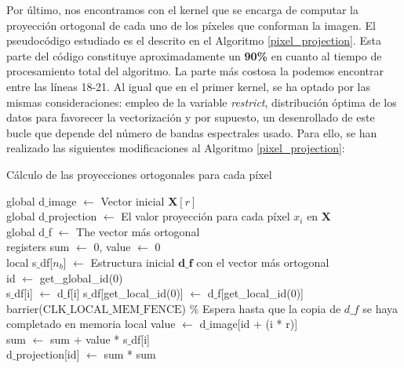 Por último, nos encontramos con el kernel que se encarga de computar la proyección ortogonal de cada uno de los píxeles que conforman la imagen. El pseudocódigo estudiado es el descrito en el Algoritmo \ref{pixel_projection}. Esta parte del código constituye aproximadamente un \textbf{90\%} en cuanto al tiempo de procesamiento total del algoritmo. La parte más costosa la podemos encontrar entre las líneas 18-21. Al igual que en el primer kernel, se ha optado por las mismas consideraciones: empleo de la variable \textit{restrict}, distribución óptima de los datos para favorecer la vectorización y por supuesto, un desenrollado de este bucle que depende del número de bandas espectrales usado. Para ello, se han realizado las siguientes modificaciones al Algoritmo  \ref{pixel_projection}:

\begin{algorithm}[htb]\small
\caption{Cálculo de las proyecciones ortogonales para cada píxel}
\begin{algorithmic}[1]
\label{pixel_projection}
\STATE global d$\_$image $\leftarrow{}$ Vector inicial $\textbf{X}[r]$\\ 
\STATE global d$\_$projection $\leftarrow{}$ El valor proyección para cada píxel ${x}_{i}$ en $\textbf{X}$\\
\STATE global d$\_$f $\leftarrow{}$ The vector más ortogonal\\
\STATE registers sum $\leftarrow{}$ 0, value $\leftarrow{}$ 0\\
\STATE local s$\_$df[$n_{b}$] $\leftarrow{}$ Estructura inicial $\textbf{d\_f}$ con el vector más ortogonal\\
\STATE id $\leftarrow{}$ get\_global\_id(0)\\
			\STATE s$\_$df[i] $\leftarrow{}$ d$\_$f[i]
		\ENDFOR 
	\ELSE
			\STATE s$\_$df[get\_local\_id(0)] $\leftarrow{}$ d$\_$f[get\_local\_id(0)]\\
		\ENDIF
	\ENDIF
	\STATE barrier($\text{CLK\_LOCAL\_MEM\_FENCE}$)
	\% Espera hasta que la copia de $d\_f$ se haya completado en memoria local
		\STATE value $\leftarrow{}$ d$\_$image[id + (i * r)]\\
		\STATE sum $\leftarrow{}$ sum + value * s$\_$df[i]\\
	\ENDFOR
	\STATE d$\_$projection[id] $\leftarrow{}$ sum * sum\\
\ENDIF
\end{algorithmic}
\end{algorithm}


